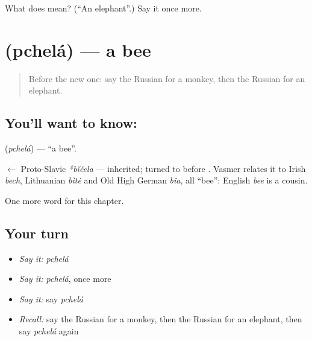 \begin{tcolorbox}[breakable,colback=teal!4,colframe=teal!35!black,title={Before you move on}]
What does  mean? (\textquotedblleft{}An elephant\textquotedblright{}.) Say it once more.
\end{tcolorbox}
\section[\texorpdfstring{\ru{пчела} (pchelá)}{пчела (pchelá)}]{ (pchelá) — a bee}

\label{lesson:RU-C120-bee}



\begin{quote}
Before the new one: say the Russian for a monkey, then the Russian for an elephant.
\end{quote}

\subsection*{You'll want to know: }
\textbf{} (\emph{pchelá}) — \textquotedblleft{}a bee\textquotedblright{}.

\begin{cousinweb}
\textbf{} $\leftarrow$ Proto-Slavic \emph{*bĭčela} — inherited; \emph{} turned to \emph{} before \emph{}. Vasmer relates it to Irish \emph{bech}, Lithuanian \emph{bìtė} and Old High German \emph{bîa}, all \textquotedblleft{}bee\textquotedblright{}: English \emph{bee} is a cousin.
\end{cousinweb}

\begin{grammarlens}[title={What you've built}]
One more word for this chapter.
\end{grammarlens}

\subsection*{Your turn}
\begin{itemize}
\raggedright
  \item \emph{Say it:} \emph{pchelá}
  \item \emph{Say it:} \emph{pchelá}, once more
  \item \emph{Say it:} say \emph{pchelá}
  \item \emph{Recall:} say the Russian for a monkey, then the Russian for an elephant, then say \emph{pchelá} again
\end{itemize}

